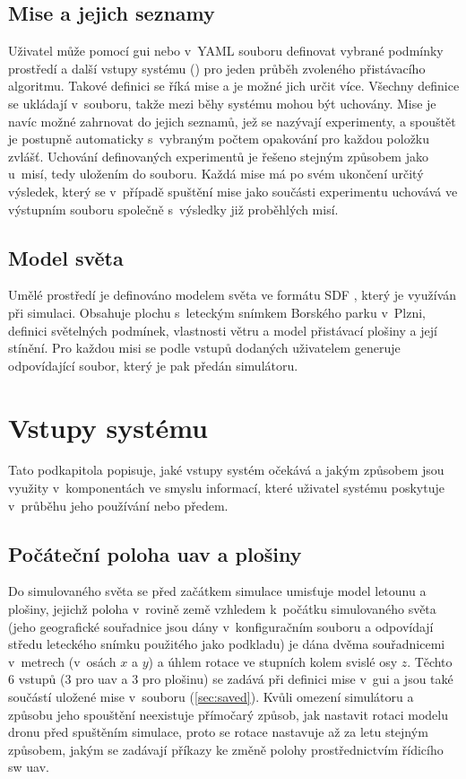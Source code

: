     \subsection{Mise a jejich seznamy}
      Uživatel může pomocí \acrshort{gui} nebo v~YAML souboru definovat vybrané podmínky prostředí a další vstupy systému () pro jeden průběh zvoleného přistávacího algoritmu. Takové definici se říká mise a je možné jich určit více. Všechny definice se ukládají v~souboru, takže mezi běhy systému mohou být uchovány. Mise je navíc možné zahrnovat do jejich seznamů, jež se nazývají experimenty, a spouštět je postupně automaticky s~vybraným počtem opakování pro každou položku zvlášť. Uchování definovaných experimentů je řešeno stejným způsobem jako u~misí, tedy uložením do souboru. Každá mise má po svém ukončení určitý výsledek, který se v~případě spuštění mise jako součásti experimentu uchovává ve výstupním souboru společně s~výsledky již proběhlých misí.
    \subsection{Model světa}
      Umělé prostředí je definováno modelem světa ve formátu SDF \cite{sdf}, který je využíván při simulaci. Obsahuje plochu s~leteckým snímkem Borského parku v~Plzni, definici světelných podmínek, vlastnosti větru a model přistávací plošiny a její stínění. Pro každou misi se podle vstupů dodaných uživatelem generuje odpovídající soubor, který je pak předán simulátoru.

  \section{Vstupy systému} \label{sec:inputs}
  Tato podkapitola popisuje, jaké vstupy systém očekává a jakým způsobem jsou využity v~komponentách ve smyslu informací, které uživatel systému poskytuje v~průběhu jeho používání nebo předem.
    \subsection{Počáteční poloha \acrshort{uav} a plošiny}
      Do simulovaného světa se před začátkem simulace umisťuje model letounu a plošiny, jejichž poloha v~rovině země vzhledem k~počátku simulovaného světa (jeho geografické souřadnice jsou dány v~konfiguračním souboru a odpovídají středu leteckého snímku použitého jako podkladu) je dána dvěma souřadnicemi v~metrech (v~osách $x$ a $y$) a úhlem rotace ve stupních kolem svislé osy $z$. Těchto 6 vstupů (3 pro \acrshort{uav} a 3 pro plošinu) se zadává při definici mise v~\acrshort{gui} a jsou také součástí uložené mise v~souboru (\cref{sec:saved}). Kvůli omezení simulátoru a způsobu jeho spouštění neexistuje přímočarý způsob, jak nastavit rotaci modelu dronu před spuštěním simulace, proto se rotace nastavuje až za letu stejným způsobem, jakým se zadávají příkazy ke změně polohy prostřednictvím řídicího \acrshort{sw} \acrshort{uav}.
